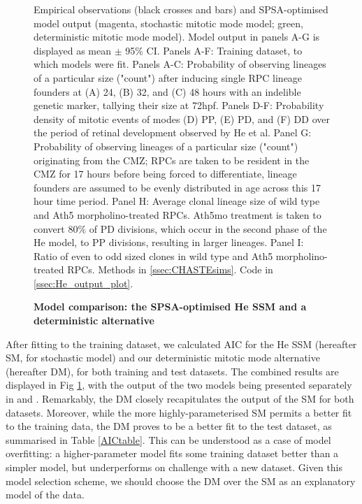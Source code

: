 \begin{figure}[p]
\caption{{\bf Model comparison: the SPSA-optimised He SSM and a deterministic alternative}}
Empirical observations (black crosses and bars) and SPSA-optimised model output (magenta, stochastic mitotic mode model; green, deterministic mitotic mode model). Model output in panels A-G is displayed as mean $\pm$ 95\% CI. Panels A-F: Training dataset, to which models were fit. Panels A-C: Probability of observing lineages of a particular size ("count") after inducing single RPC lineage founders at (A) 24, (B) 32, and (C) 48 hours with an indelible genetic marker, tallying their size at 72hpf. Panels D-F: Probability density of mitotic events of modes (D) PP, (E) PD, and (F) DD over the period of retinal development observed by He et al. Panel G: Probability of observing lineages of a particular size ("count") originating from the CMZ; RPCs are taken to be resident in the CMZ for 17 hours before being forced to differentiate, lineage founders are assumed to be evenly distributed in age across this 17 hour time period. Panel H: Average clonal lineage size of wild type and Ath5 morpholino-treated RPCs. Ath5mo treatment is taken to convert 80\% of PD divisions, which occur in the second phase of the He model, to PP divisions, resulting in larger lineages. Panel I: Ratio of even to odd sized clones in wild type and Ath5 morpholino-treated RPCs.
Methods in \autoref{ssec:CHASTEsims}.
Code in \autoref{ssec:He_output_plot}.
\label{SDFig}
\end{figure}
\FloatBarrier

After fitting to the training dataset, we calculated AIC for the He SSM (hereafter SM, for stochastic model) and our deterministic mitotic mode alternative (hereafter DM), for both training and test datasets. The combined results are displayed in Fig \ref{SDFig}, with the output of the two models being presented separately in  and . Remarkably, the DM closely recapitulates the output of the SM for both datasets. Moreover, while the more highly-parameterised SM permits a better fit to the training data, the DM proves to be a better fit to the test dataset, as summarised in Table \ref{AICtable}. This can be understood as a case of model overfitting: a higher-parameter model fits some training dataset better than a simpler model, but underperforms on challenge with a new dataset. Given this model selection scheme, we should choose the DM over the SM as an explanatory model of the data.

